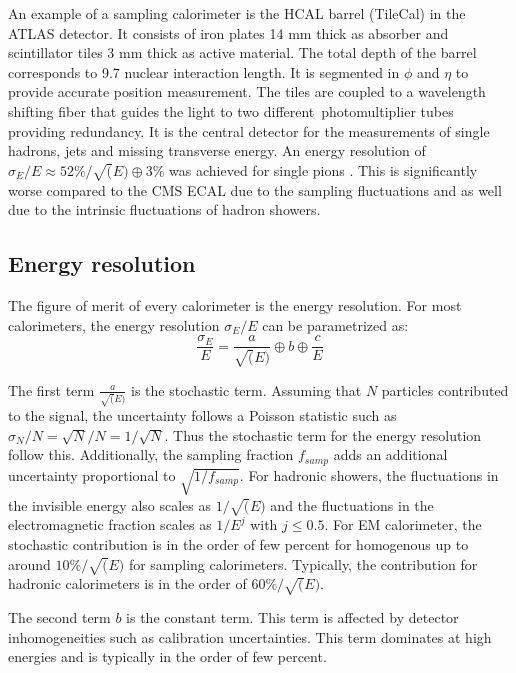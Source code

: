 An example of a sampling calorimeter is the HCAL barrel (TileCal) in the ATLAS detector. It consists of iron plates 14 mm thick as absorber and scintillator tiles 3 mm thick as active material. The total depth of the barrel corresponds to 9.7 nuclear interaction length. It is segmented in $\phi$ and $\eta$ to provide accurate position measurement. The tiles are coupled to a wavelength shifting fiber that guides the light to two different photomultiplier tubes providing redundancy. It is the central detector for the measurements of single hadrons, jets and missing transverse energy. An energy resolution of $\sigma_E/E \approx 52\%/\sqrt(E) \oplus 3\%$ was achieved for single pions \cite{Henriques:2015fso}. This is significantly worse compared to the CMS ECAL due to the sampling fluctuations and as well due to the intrinsic fluctuations of hadron showers.

\subsection{Energy resolution}
\label{subsec:EnergyReso}

The figure of merit of every calorimeter is the energy resolution. For most calorimeters, the energy resolution $\sigma_E/E$ can be parametrized as:
\begin{equation} \label{eq:EnergyReso}
  \frac{\sigma_E}{E} = \frac{a}{\sqrt(E)} \oplus b \oplus \frac{c}{E}
\end{equation}

The first term $\frac{a}{\sqrt(E)}$ is the stochastic term. Assuming that $N$ particles contributed to the signal, the uncertainty follows a Poisson statistic such as $\sigma_N/N = \sqrt{N}/N = 1/\sqrt{N}$. Thus the stochastic term for the energy resolution follow this. Additionally, the sampling fraction $f_{samp}$ adds an additional uncertainty proportional to $\sqrt{1/f_{samp}}$. For hadronic showers, the fluctuations in the invisible energy also scales as $1/\sqrt(E)$ and the fluctuations in the electromagnetic fraction scales as $1/E^j$ with $j \leq 0.5$. For EM calorimeter, the stochastic contribution is in the order of few percent for homogenous up to around $10\%/\sqrt(E)$ for sampling calorimeters. Typically, the contribution for hadronic calorimeters is in the order of $60\%/\sqrt(E)$.

The second term $b$ is the constant term. This term is affected by detector inhomogeneities such as calibration uncertainties. This term dominates at high energies and is typically in the order of few percent.

